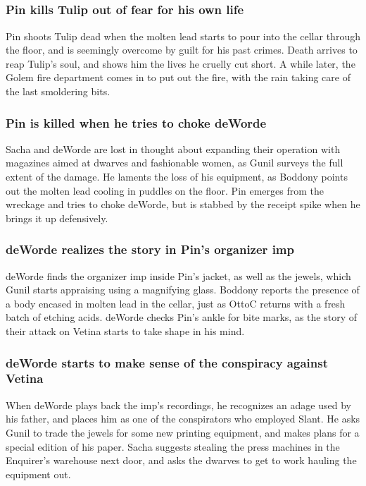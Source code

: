 \subsection{}
\subsubsection{\Gls{Pin} kills \Gls{Tulip} out of fear for his own life}
\Gls{Pin} shoots \Gls{Tulip} dead when the molten lead starts to pour into the cellar through the
floor, and is seemingly overcome by guilt for his past crimes. \Gls{Death} arrives to reap
\Gls{Tulip}'s soul, and shows him the lives he cruelly cut short. A while later, the Golem fire
department comes in to put out the fire, with the rain taking care of the last smoldering bits.

\subsubsection{\Gls{Pin} is killed when he tries to choke \Gls{deWorde}}
\Gls{Sacha} and \Gls{deWorde} are lost in thought about expanding their operation with magazines
aimed at dwarves and fashionable women, as \Gls{Gunil} surveys the full extent of the damage. He
laments the loss of his equipment, as \Gls{Boddony} points out the molten lead cooling in puddles
on the floor. \Gls{Pin} emerges from the wreckage and tries to choke \Gls{deWorde}, but is stabbed
by the receipt spike when he brings it up defensively.

\subsubsection{\Gls{deWorde} realizes the story in \Gls{Pin}'s organizer imp}
\Gls{deWorde} finds the organizer imp inside \Gls{Pin}'s jacket, as well as the jewels, which
\Gls{Gunil} starts appraising using a magnifying glass. \Gls{Boddony} reports the presence of a body
encased in molten lead in the cellar, just as \Gls{OttoC} returns with a fresh batch of etching
acids. \Gls{deWorde} checks \Gls{Pin}'s ankle for bite marks, as the story of their attack on
\Gls{Vetina} starts to take shape in his mind.

\subsubsection{\Gls{deWorde} starts to make sense of the conspiracy against \Gls{Vetina}}
When \Gls{deWorde} plays back the imp's recordings, he recognizes an adage used by his father, and
places him as one of the conspirators who employed \Gls{Slant}. He asks \Gls{Gunil} to trade the
jewels for some new printing equipment, and makes plans for a special edition of his paper.
\Gls{Sacha} suggests stealing the press machines in the Enquirer's warehouse next door, and asks
the dwarves to get to work hauling the equipment out.

